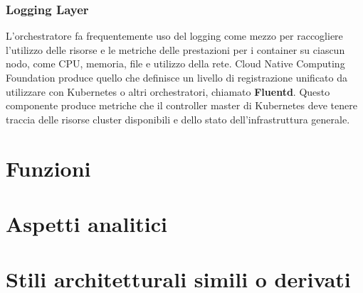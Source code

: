 \documentclass[12pt, a4paper]{report}
\begin{document}
\subsection{Logging Layer}
L'orchestratore fa frequentemente uso del logging come mezzo per raccogliere l'utilizzo delle risorse e le metriche delle prestazioni per i container su ciascun nodo, come CPU, memoria, file e utilizzo della rete. Cloud Native Computing Foundation produce quello che definisce un livello di registrazione unificato da utilizzare con Kubernetes o altri orchestratori, chiamato \textbf{Fluentd}. Questo componente produce metriche che il controller master di Kubernetes deve tenere traccia delle risorse cluster disponibili e dello stato dell'infrastruttura generale.
\chapter{Funzioni}
\chapter{Aspetti analitici}
\chapter{Stili architetturali simili o derivati}

\end{document}
